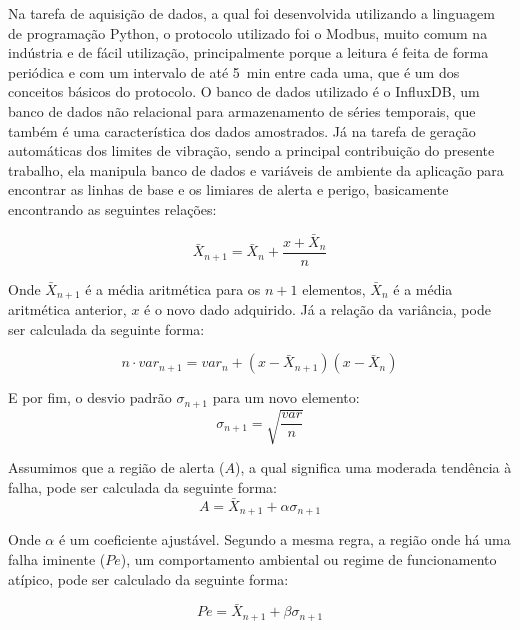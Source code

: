 \documentclass[a4paper]{ifacconf}
\begin{document}
Na tarefa de aquisição de dados, a qual foi desenvolvida utilizando a linguagem de programação Python, o protocolo utilizado foi o Modbus, 
muito comum na indústria e de fácil utilização, principalmente porque a leitura é feita de forma periódica e com um intervalo de até 
\SI{5}{\minute} entre cada uma, que é um dos conceitos básicos do protocolo. O banco de dados utilizado é o InfluxDB, um banco de dados não 
relacional para armazenamento de séries temporais, que também é uma característica dos dados amostrados.
Já na tarefa de geração automáticas dos limites de vibração, sendo a principal contribuição do presente trabalho, ela manipula banco de dados e 
variáveis de ambiente da aplicação para encontrar as linhas de base e os limiares de alerta e perigo, basicamente encontrando as seguintes 
relações:

\begin{equation}\label{eq:ml}
    \bar{X}_{n+1} = \bar{X}_{n} + \frac{x + \bar{X}_n}{n}
\end{equation}

Onde $\bar{X}_{n+1}$ é a média aritmética para os $n+1$ elementos, $ \bar{X}_{n}$ é a média aritmética anterior,
$x$ é o novo dado adquirido. Já a relação da variância, pode ser calculada da seguinte forma:


\begin{equation}\label{eq:ml2}
    n \cdot var_{n+1} = var_{n} + (x - \bar{X}_{n+1})(x-\bar{X}_n)
\end{equation}

E por fim, o desvio padrão $\sigma_{n+1}$ para um novo elemento:
\begin{equation}\label{eq:ml3}
    \sigma_{n+1} = \sqrt{\frac{var}{n}}
\end{equation}

Assumimos que a região de alerta ($A$), a qual significa uma moderada tendência à falha, pode ser calculada da seguinte forma: 
\begin{equation}\label{eq:ml4}
    A = \bar{X}_{n+1} + \alpha \sigma_{n+1} 
\end{equation}

Onde $\alpha$ é um coeficiente ajustável. Segundo a mesma regra, a região onde há uma falha iminente ($Pe$), um comportamento ambiental ou regime de funcionamento atípico, 
pode ser calculado da seguinte forma:

\begin{equation}\label{eq:ml5}
    Pe = \bar{X}_{n+1} + \beta \sigma_{n+1} 
\end{equation}
\end{document}
